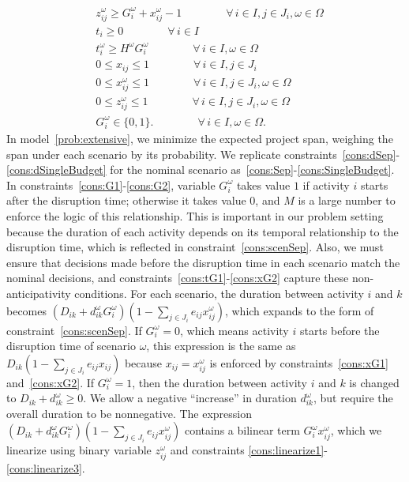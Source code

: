 \documentclass[11pt]{article}
\begin{document}
\begin{subequations}
\begin{align}
		& z_{ij}^\omega \geq G_i^\omega + x_{ij}^\omega - 1 \qquad \qquad \forall \,i \in I, j \in J_i, \omega \in \Omega \label{cons:linearize3}\\
		& t_i \geq 0 \qquad \qquad \forall \,i \in I \label{cons:nonnegt}\\
		& t_i^\omega \geq H^\omega G_i^\omega \qquad \qquad \forall\, i \in I, \omega \in \Omega \label{cons:extra} \\
		& 0 \leq x_{ij} \leq 1 \qquad \qquad \forall \,i \in I, j \in J_i\\ 
		& 0 \leq x_{ij}^\omega \leq 1 \qquad \qquad \forall \,i \in I, j \in J_i, \omega \in \Omega\\
		& 0 \leq z_{ij}^\omega \leq 1 \qquad \qquad \forall \,i \in I, j \in J_i, \omega \in \Omega\\
		& G_i^\omega \in \{0,1\}. \qquad \qquad \forall \,i \in I, \omega \in \Omega. \label{cons:Gbounds}
		\end{align}
	\end{subequations}
	In model~\eqref{prob:extensive}, we minimize the expected project span, weighing the span under each scenario by its probability. We replicate constraints~\eqref{cons:dSep}-\eqref{cons:dSingleBudget} for the nominal scenario as~\eqref{cons:Sep}-\eqref{cons:SingleBudget}. In constraints~\eqref{cons:G1}-\eqref{cons:G2}, variable \(G^\omega_i\) takes value \(1\) if activity \(i\) starts after the disruption time; otherwise it takes value 0, and \(M\) is a large number to enforce the logic of this relationship. This is important in our problem setting because the duration of each activity depends on its temporal relationship to the disruption time, which is reflected in constraint~\eqref{cons:scenSep}. Also, we must ensure that decisions made before the disruption time in each scenario match the nominal decisions, and constraints~\eqref{cons:tG1}-\eqref{cons:xG2} capture these non-anticipativity conditions. For each scenario, the duration between activity \(i\) and \(k\) becomes \((D_{ik} + d_{ik}^\omega G_i^\omega)(1 - \sum_{j \in J_i} e_{ij}x_{ij}^\omega)\), which expands to the form of constraint~\eqref{cons:scenSep}. If \(G_i^\omega = 0\), which means activity \(i\) starts before the disruption time of scenario \(\omega\), this expression is the same as \(D_{ik} (1 - \sum_{j \in J_i} e_{ij}x_{ij})\) because \(x_{ij} = x_{ij}^\omega\) is enforced by constraints~\eqref{cons:xG1} and~\eqref{cons:xG2}. If \(G_i^\omega = 1\), then the duration between activity \(i\) and \(k\) is changed to \(D_{ik} + d_{ik}^\omega \ge 0\). We allow a negative ``increase'' in duration $d_{ik}^\omega$, but require the overall duration to be nonnegative. The expression \((D_{ik} + d_{ik}^\omega G_i^\omega)(1 - \sum_{j \in J_i} e_{ij}x_{ij}^\omega)\) contains a bilinear term \(G_i^\omega x_{ij}^\omega\), which we linearize using binary variable \(z_{ij}^\omega\) and constraints \eqref{cons:linearize1}-\eqref{cons:linearize3}.
	
\end{document}
